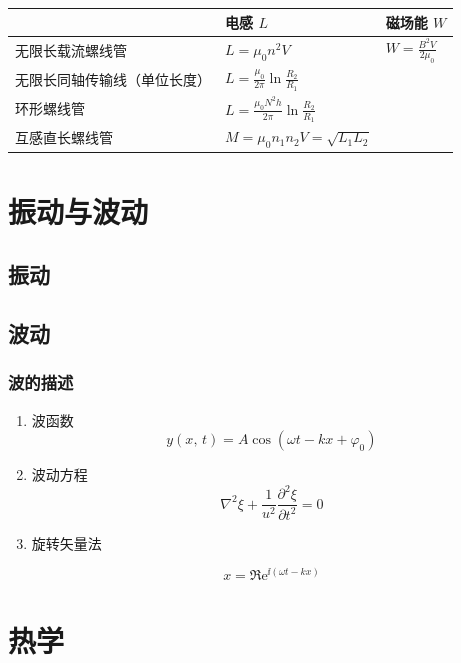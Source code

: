 \documentclass[UTF8,fontset=fandol,zihao=5]{ctexart}
\newcommand{\ee}{\mathrm{e}}
\begin{document}
\begin{center}
\begin{tabularx}{0.96\textwidth}{>{\raggedright\arraybackslash}p{3.8cm}X X}
\toprule
  & 电感 \(L\) & 磁场能 \(W\)\\
\midrule
无限长载流螺线管 & \(\displaystyle L=\mu_0 n^2 V\) & \(\displaystyle W=\frac{B^2 V}{2\mu_0}\)\\
无限长同轴传输线（单位长度） & \(\displaystyle L=\frac{\mu_0}{2\pi}\ln\frac{R_2}{R_1}\) & \\
环形螺线管 & \(\displaystyle L=\frac{\mu_0 N^2 h}{2\pi}\ln\frac{R_2}{R_1}\) & \\
互感直长螺线管 & \(M=\mu_0 n_1 n_2 V=\sqrt{L_1 L_2}\) & \\
\bottomrule
\end{tabularx}
\end{center}

\section{振动与波动}

\subsection{振动}

\subsection{波动}

\subsubsection{波的描述}

\begin{enumerate}
  \item 波函数
  \[
  y(x,\,t)=A\cos\left(\omega t - kx + \varphi_0 \right)
  \]


  \item 波动方程
  \[
  \nabla^2\xi+\frac{1}{u^2}\frac{\partial^2\xi}{\partial t^2}=0
  \]

  \item 旋转矢量法
  
  \[
  x=\Re\ee^{\ii(\omega t-kx)}
  \]
\end{enumerate}


\section{热学}
\end{document}

